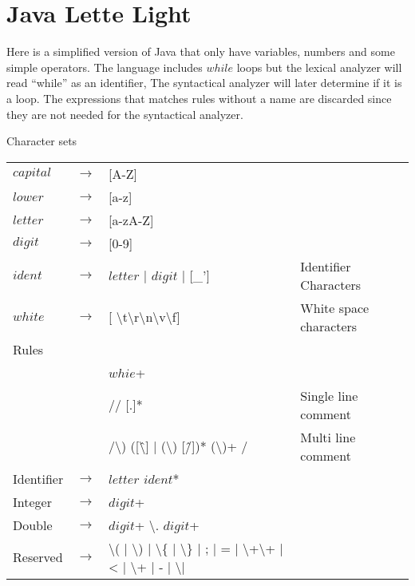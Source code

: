 \chapter{Java Lette Light}\label{reglang}
Here is a simplified version of Java that only have variables, numbers and some
simple operators. The language includes $while$ loops but the lexical analyzer
will read ``while'' as an identifier, The syntactical analyzer will later
determine if it is a loop. The expressions that matches rules without a name
are discarded since they are not needed for the syntactical analyzer.

Character sets\\
\begin{tabular}{l c l l}
$capital$ & $\rightarrow$ & [A-Z]\\
$lower$   & $\rightarrow$ & [a-z]\\
$letter$  & $\rightarrow$ & [a-zA-Z]\\
$digit$   & $\rightarrow$ & [0-9]\\
$ident$   & $\rightarrow$ & $letter$ | $digit$ | [\_'] & Identifier Characters\\
$white$   & $\rightarrow$ & [ \textbackslash{t}\textbackslash{r}\textbackslash{n}\textbackslash{v}\textbackslash{f}] & White space characters\\
Rules\\
& & $whie$+\\
& & // [.]* & Single line comment\\
& & /\textbackslash*) ([\^\textbackslash*] | (\textbackslash*) [\^/])*
    (\textbackslash*)+ / & Multi line comment\\
Identifier & $\rightarrow$ & $letter$ $ident$*\\
Integer    & $\rightarrow$ & $digit$+\\
Double     & $\rightarrow$ & $digit$+ \textbackslash. $digit$+\\
Reserved   & $\rightarrow$ & \textbackslash( | \textbackslash) | \textbackslash\{
                         | \textbackslash\} | ; | = | \textbackslash+\textbackslash+
                         | < | \textbackslash+ | - | \textbackslash* | \/ \\ %
\end{tabular}
